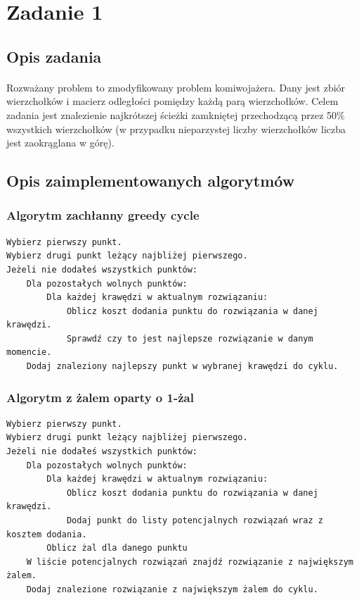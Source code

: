 \documentclass[a4paper]{article}
\begin{document}
\section{Zadanie 1}

\subsection{Opis zadania}

\paragraph{}
Rozważany problem to zmodyfikowany problem komiwojażera. Dany jest zbiór wierzchołków i macierz odległości pomiędzy każdą parą wierzchołków. Celem zadania jest znalezienie najkrótszej ścieżki zamkniętej przechodzącą przez 50\% wszystkich wierzchołków (w przypadku nieparzystej liczby wierzchołków liczba jest zaokrąglana w górę).

\subsection{Opis zaimplementowanych algorytmów}

\subsubsection{Algorytm zachłanny greedy cycle}

\begin{lstlisting}
Wybierz pierwszy punkt.
Wybierz drugi punkt leżący najbliżej pierwszego.
Jeżeli nie dodałeś wszystkich punktów:
	Dla pozostałych wolnych punktów:
		Dla każdej krawędzi w aktualnym rozwiązaniu:
			Oblicz koszt dodania punktu do rozwiązania w danej krawędzi.
			Sprawdź czy to jest najlepsze rozwiązanie w danym momencie.
	Dodaj znaleziony najlepszy punkt w wybranej krawędzi do cyklu.
\end{lstlisting}

\subsubsection{Algorytm z żalem oparty o 1-żal}

\begin{lstlisting}
Wybierz pierwszy punkt.
Wybierz drugi punkt leżący najbliżej pierwszego.
Jeżeli nie dodałeś wszystkich punktów:
	Dla pozostałych wolnych punktów:
		Dla każdej krawędzi w aktualnym rozwiązaniu:
			Oblicz koszt dodania punktu do rozwiązania w danej krawędzi.
			Dodaj punkt do listy potencjalnych rozwiązań wraz z kosztem dodania.
		Oblicz żal dla danego punktu
	W liście potencjalnych rozwiązań znajdź rozwiązanie z największym żalem.
	Dodaj znalezione rozwiązanie z największym żalem do cyklu.
\end{lstlisting}
\end{document}
